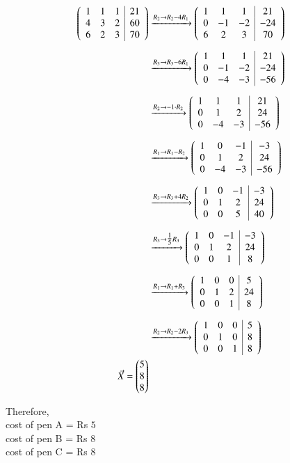 \documentclass[journal]{IEEEtran}
\begin{document}
\begin{align}
\augvec{3}{1}{
1 & 1 & 1 & 21 \\
4 & 3 & 2 & 60 \\
6 & 2 & 3 & 70}
&\xrightarrow{R_2 \to R_2 - 4R_1}
\augvec{3}{1}{
1 & 1 & 1 & 21 \\
0 & -1 & -2 & -24 \\
6 & 2 & 3 & 70} \\[6pt]
&\xrightarrow{R_3 \to R_3 - 6R_1}
\augvec{3}{1}{
1 & 1 & 1 & 21 \\
0 & -1 & -2 & -24 \\
0 & -4 & -3 & -56} \\[6pt]
&\xrightarrow{R_2 \to -1 \cdot R_2}
\augvec{3}{1}{
1 & 1 & 1 & 21 \\
0 & 1 & 2 & 24 \\
0 & -4 & -3 & -56} \\[6pt]
&\xrightarrow{R_1 \to R_1 - R_2}
\augvec{3}{1}{
1 & 0 & -1 & -3 \\
0 & 1 & 2 & 24 \\
0 & -4 & -3 & -56} \\[6pt]
&\xrightarrow{R_3 \to R_3 + 4R_2}
\augvec{3}{1}{
1 & 0 & -1 & -3 \\
0 & 1 & 2 & 24 \\
0 & 0 & 5 & 40} \\[6pt]
&\xrightarrow{R_3 \to \tfrac{1}{5} R_3}
\augvec{3}{1}{
1 & 0 & -1 & -3 \\
0 & 1 & 2 & 24 \\
0 & 0 & 1 & 8} \\[6pt]
&\xrightarrow{R_1 \to R_1 + R_3}
\augvec{3}{1}{
1 & 0 & 0 & 5 \\
0 & 1 & 2 & 24 \\
0 & 0 & 1 & 8} \\[6pt]
&\xrightarrow{R_2 \to R_2 - 2R_3}
\augvec{3}{1}{
1 & 0 & 0 & 5 \\
0 & 1 & 0 & 8 \\
0 & 0 & 1 & 8}\\
  \Vec{X}=\myvec{5
                \\
                 8
                \\
                8}
\end{align}

Therefore,\\
          cost of pen A = Rs $5$\\
          cost of pen B = Rs $8$\\
          cost of pen C = Rs $8$
\end{document}
